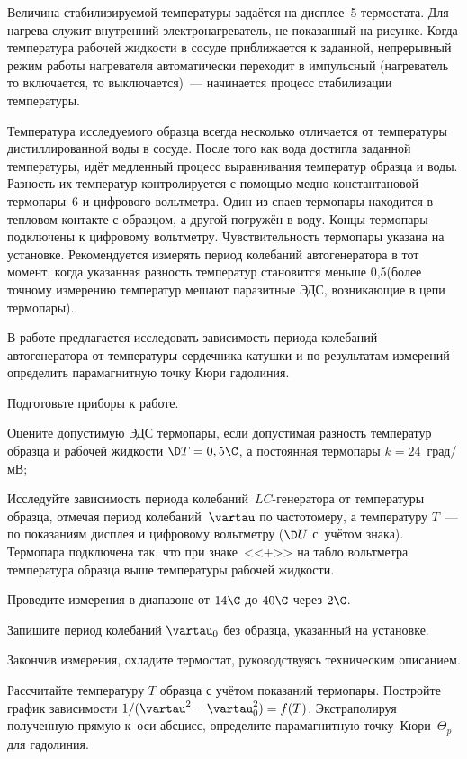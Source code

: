 Величина стабилизируемой температуры задаётся на дисплее~5 термостата. Для нагрева служит внутренний электронагреватель,
не показанный на рисунке. Когда температура рабочей жидкости в сосуде приближается к заданной, непрерывный режим работы
нагревателя автоматически переходит в импульсный (нагреватель то включается, то выключается)~--- начинается процесс
стабилизации температуры.

Температура исследуемого образца всегда несколько отличается от температуры дистиллированной воды в сосуде. После того
как вода достигла заданной температуры, идёт медленный процесс выравнивания температур образца и воды. Разность их
температур контролируется с помощью медно-константановой термопары~6 и цифрового вольтметра. Один из спаев термопары
находится в тепловом контакте с образцом, а другой погружён в воду. Концы термопары подключены к цифровому вольтметру.
Чувствительность термопары указана на установке. Рекомендуется измерять период колебаний автогенератора в тот момент,
когда указанная разность температур становится меньше 0,5\C (более точному измерению температур мешают паразитные ЭДС,
возникающие в цепи термопары).

\zad

В работе предлагается исследовать зависимость периода колебаний автогенератора от температуры сердечника катушки и по
результатам измерений определить парамагнитную точку Кюри гадолиния.

\dopop

\n Подготовьте приборы к работе.

\n Оцените допустимую ЭДС термопары, если допустимая разность температур образца и рабочей жидкости $\D T=0,5\C$, а
постоянная термопары $k=24$~град/мВ;

\n Исследуйте зависимость периода колебаний~$LC$-генератора от температуры образца, отмечая период колебаний~$\vartau$
по частотомеру, а температуру $T$~--- по показаниям дисплея и цифровому вольтметру ($\D U$ с~учётом знака). Термопара
подключена так, что при знаке~<<+>> на табло вольтметра температура образца выше температуры рабочей жидкости.

Проведите измерения в диапазоне от $14\C$ до $40\C$ через $2\C$.

Запишите период колебаний $\vartau_0$ без образца, указанный на установке.

\n Закончив измерения, охладите термостат, руководствуясь техническим описанием.


\Obrab

\n Рассчитайте температуру $T$ образца с учётом показаний термопары. Постройте график зависимости
$1/(\vartau^2-\vartau_0^2)=f(T)$. Экстраполируя полученную прямую к~оси абсцисс, определите парамагнитную
точку~Кюри~$\Theta_p$ для гадолиния.

